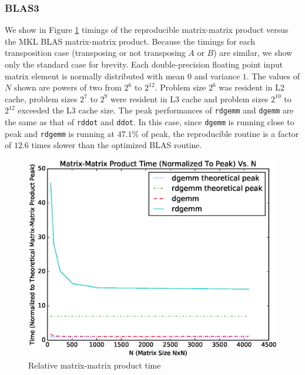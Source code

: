   \subsubsection{BLAS3}
    We show in Figure \ref{fig:gemm_timings} timings of the reproducible matrix-matrix product versus the MKL BLAS matrix-matrix product. Because the timings for each transposition case (transposing or not transposing $A$ or $B$) are similar, we show only the standard case for brevity. Each double-precision floating point input matrix element is normally distributed with mean $0$ and variance $1$. The values of $N$ shown are powers of two from $2^6$ to $2^{12}$. Problem size $2^6$ was resident in L2 cache, problem sizes $2^7$ to $2^9$ were resident in L3 cache and problem sizes $2^{10}$ to $2^{12}$ exceeded the L3 cache size. The peak performances of \texttt{rdgemm} and \texttt{dgemm} are the same as that of \texttt{rddot} and \texttt{ddot}. In this case, since \texttt{dgemm} is running close to peak and \texttt{rdgemm} is running at $47.1\%$ of peak, the reproducible routine is a factor of $12.6$ times slower than the optimized BLAS routine.
  \begin{figure}[H]
  \begin{center}
  \includegraphics[width=\textwidth]{plots/gemm_comparison}
  \caption{Relative matrix-matrix product time}
  \label{fig:gemm_timings}
  \end{center}
  \end{figure}
